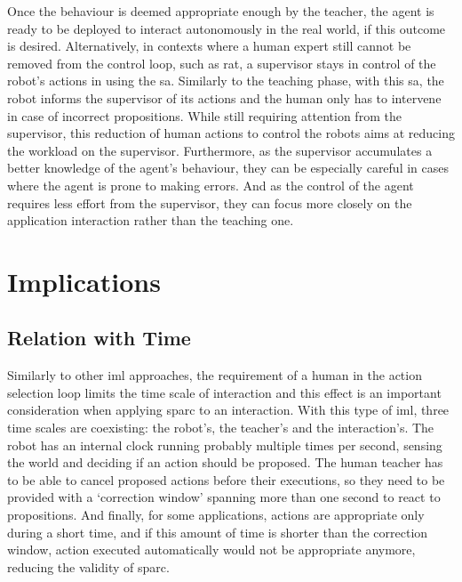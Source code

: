 Once the behaviour is deemed appropriate enough by the teacher, the agent is ready to be deployed to interact autonomously in the real world, if this outcome is desired. Alternatively, in contexts where a human expert still cannot be removed from the control loop, such as \gls{rat}, a supervisor stays in control of the robot's actions in using the \gls{sa}. Similarly to the teaching phase, with this \gls{sa}, the robot informs the supervisor of its actions and the human only has to intervene in case of incorrect propositions. While still requiring attention from the supervisor, this reduction of human actions to control the robots aims at reducing the workload on the supervisor. Furthermore, as the supervisor accumulates a better knowledge of the agent's behaviour, they can be especially careful in cases where the agent is prone to making errors. And as the control of the agent requires less effort from the supervisor, they can focus more closely on the application interaction rather than the teaching one. 

\section{Implications}

\subsection{Relation with Time} \label{ssec:sparc_time}
Similarly to other \gls{iml} approaches, the requirement of a human in the action selection loop limits the time scale of interaction and this effect is an important consideration when applying \gls{sparc} to an interaction. With this type of \gls{iml}, three time scales are coexisting: the robot's, the teacher's and the interaction's. The robot has an internal clock running probably multiple times per second, sensing the world and deciding if an action should be proposed. The human teacher has to be able to cancel proposed actions before their executions, so they need to be provided with a `correction window' spanning more than one second to react to propositions. And finally, for some applications, actions are appropriate only during a short time, and if this amount of time is shorter than the correction window, action executed automatically would not be appropriate anymore, reducing the validity of \gls{sparc}.

